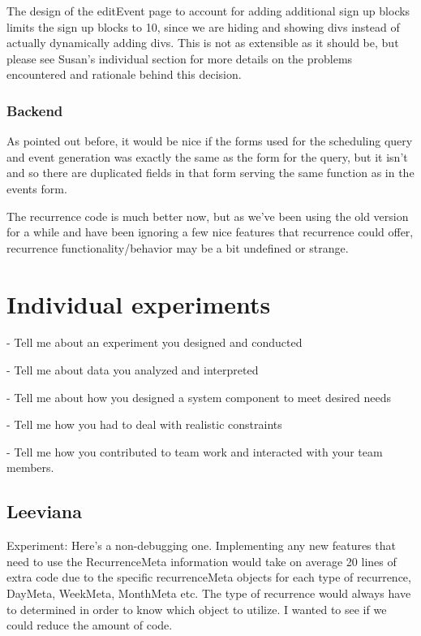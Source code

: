 \documentclass{article}
\begin{document}
	The design of the editEvent page to account for adding additional sign up blocks limits the sign up blocks to 10, since we are hiding and showing divs instead of actually dynamically adding divs. This is not as extensible as it should be, but please see Susan’s individual section for more details on the problems encountered and rationale behind this decision. 


\subsubsection{Backend}

As pointed out before, it would be nice if the forms used for the scheduling query and event generation was exactly the same as the form for the query, but it isn't and so there are duplicated fields in that form serving the same function as in the events form. 

The recurrence code is much better now, but as we've been using the old version for a while and have been ignoring a few nice features that recurrence could offer, recurrence functionality/behavior may be a bit undefined or strange.

\section{Individual experiments}

- Tell me about an experiment you designed and conducted

- Tell me about data you analyzed and interpreted 

- Tell me about how you designed a system component to meet desired needs

- Tell me how you had to deal with realistic constraints

- Tell me how you contributed to team work and interacted with your team members.
 
 
\subsection{Leeviana}

Experiment: Here's a non-debugging one. Implementing any new features that need to use the RecurrenceMeta information would take on average 20 lines of extra code due to the specific recurrenceMeta objects for each type of recurrence, DayMeta, WeekMeta, MonthMeta etc. The type of recurrence would always have to determined in order to know which object to utilize. I wanted to see if we could reduce the amount of code.
\end{document}
